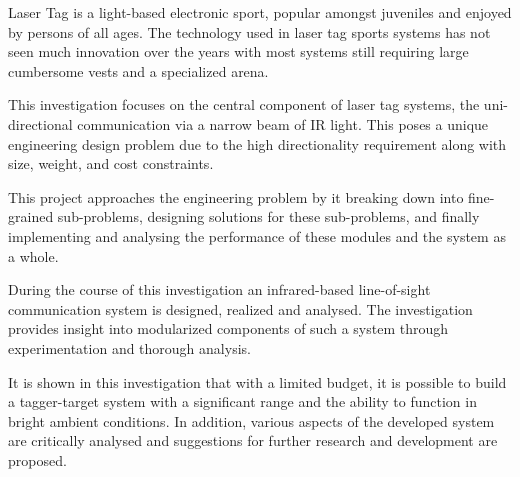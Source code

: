 Laser Tag is a light-based electronic sport, popular amongst juveniles and enjoyed by persons of all ages. The technology used in laser tag sports systems has not seen much innovation over the years with most systems still requiring large cumbersome vests and a specialized arena.

This investigation focuses on the central component of laser tag systems, the uni-directional communication via a narrow beam of IR light. This poses a unique engineering design problem due to the high directionality requirement along with size, weight, and cost constraints.

This project approaches the engineering problem by it breaking down into fine-grained sub-problems, designing solutions for these sub-problems, and finally implementing and analysing the performance of these modules and the system as a whole.

During the course of this investigation an infrared-based line-of-sight communication system is designed, realized and analysed. The investigation provides insight into modularized components of such a system through experimentation and thorough analysis.

It is shown in this investigation that with a limited budget, it is possible to build a tagger-target system with a significant range and the ability to function in bright ambient conditions. In addition, various aspects of the developed system are critically analysed and suggestions for further research and development are proposed.


\iffalse
Your abstract provides a good idea of where the project is going, however, it's missing your key findings and conclusion. An abstract is a highly condensed summary of the entire project and usually follows the following format: intro and problem, project aim, methods, key findings and conclusion.

The abstract is usually the most difficult part to write because of how condensed it needs to be. If you need inspiration, have a look at the abstracts of relevant journal articles :)
\fi